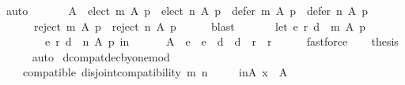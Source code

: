 \begin{isabellebody}
\ auto\isanewline
\ \ \isamarkupfalse%
\isanewline
\ \ \ \ {\isachardoublequoteopen}A\ {\isacharminus}{\kern0pt}\ {\isacharparenleft}{\kern0pt}{\isacharparenleft}{\kern0pt}elect\ m\ A\ p{\isacharparenright}{\kern0pt}\ {\isasymunion}\ {\isacharparenleft}{\kern0pt}elect\ n\ A\ p{\isacharparenright}{\kern0pt}\ {\isasymunion}\ {\isacharparenleft}{\kern0pt}defer\ m\ A\ p{\isacharparenright}{\kern0pt}\ {\isasymunion}\ {\isacharparenleft}{\kern0pt}defer\ n\ A\ p{\isacharparenright}{\kern0pt}{\isacharparenright}{\kern0pt}\ {\isacharequal}{\kern0pt}\isanewline
\ \ \ \ \ \ {\isacharparenleft}{\kern0pt}reject\ m\ A\ p{\isacharparenright}{\kern0pt}\ {\isasyminter}\ {\isacharparenleft}{\kern0pt}reject\ n\ A\ p{\isacharparenright}{\kern0pt}{\isachardoublequoteclose}\isanewline
\ \ \ \ \isamarkupfalse%
\ blast\isanewline
\ \ \isamarkupfalse%
\isanewline
\ \ \ \ {\isachardoublequoteopen}let\ {\isacharparenleft}{\kern0pt}e{}{\isacharcomma}{\kern0pt}\ r{}{\isacharcomma}{\kern0pt}\ d{}{\isacharparenright}{\kern0pt}\ {\isacharequal}{\kern0pt}\ m\ A\ p{\isacharsemicolon}{\kern0pt}\isanewline
\ \ \ \ \ \ \ \ {\isacharparenleft}{\kern0pt}e{}{\isacharcomma}{\kern0pt}\ r{}{\isacharcomma}{\kern0pt}\ d{}{\isacharparenright}{\kern0pt}\ {\isacharequal}{\kern0pt}\ n\ A\ p\ in\isanewline
\ \ \ \ \ \ A\ {\isacharminus}{\kern0pt}\ {\isacharparenleft}{\kern0pt}e{}\ {\isasymunion}\ e{}\ {\isasymunion}\ d{}\ {\isasymunion}\ d{}{\isacharparenright}{\kern0pt}\ {\isacharequal}{\kern0pt}\ r{}\ {\isasyminter}\ r{}{\isachardoublequoteclose}\isanewline
\ \ \ \ \isamarkupfalse%
\ fastforce\isanewline
\ \ \isamarkupfalse%
\ {\isacharquery}{\kern0pt}thesis\isanewline
\ \ \ \ \isamarkupfalse%
\ auto\isanewline
{}\isamarkupfalse%
%
\endisatagproof
{\isafoldproof}%
%
\isadelimproof
\isanewline
%
\endisadelimproof
\isanewline
{}\isamarkupfalse%
\ dcompat{\isacharunderscore}{\kern0pt}dec{\isacharunderscore}{\kern0pt}by{\isacharunderscore}{\kern0pt}one{\isacharunderscore}{\kern0pt}mod{\isacharcolon}{\kern0pt}\isanewline
\ \ \isanewline
\ \ \ \ compatible{\isacharcolon}{\kern0pt}\ {\isachardoublequoteopen}disjoint{\isacharunderscore}{\kern0pt}compatibility\ m\ n{\isachardoublequoteclose}\ \isanewline
\ \ \ \ in{\isacharunderscore}{\kern0pt}A{\isacharcolon}{\kern0pt}\ {\isachardoublequoteopen}x\ {\isasymin}\ A{\isachardoublequoteclose}\isanewline

\end{isabellebody}
